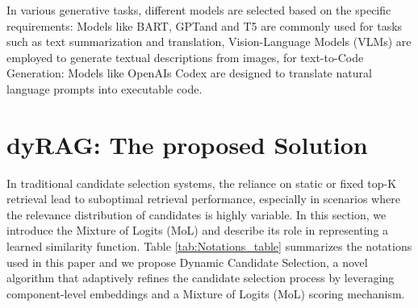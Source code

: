 \documentclass[review]{jair}
\begin{document}
In various generative tasks, different models are selected based on the specific requirements: Models like BART\cite{lewis2019bart}, GPT\cite{brown2020language}and and T5 \cite{raffel2020exploring} are commonly used for tasks such as text summarization and translation, Vision-Language Models (VLMs) \cite{radford2021learningtransferablevisualmodels} are employed to generate textual descriptions from images, for text-to-Code Generation: Models like OpenAIs Codex \cite{chen2021evaluatinglargelanguagemodels} are designed to translate natural language prompts into executable code.


\section{dyRAG: The proposed Solution}\label{sec3}
In traditional candidate selection systems, the reliance on static or fixed top-K retrieval lead to suboptimal retrieval performance, especially in scenarios where the relevance distribution of candidates is highly variable. In this section, we introduce the Mixture of Logits (MoL) and describe its role in representing a learned similarity function. Table \ref{tab:Notations_table} summarizes the notations used in this paper and we propose Dynamic Candidate Selection, a novel algorithm that adaptively refines the candidate selection process by leveraging component-level embeddings and a Mixture of Logits (MoL) scoring mechanism.
\end{document}
